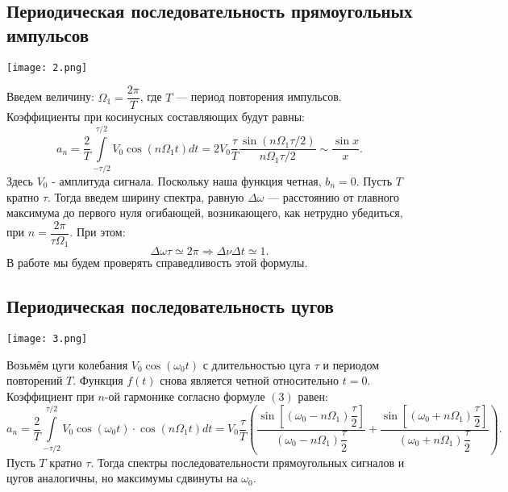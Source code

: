 \documentclass[a4paper,11pt]{extarticle}
\begin{document}
\subsection*{Периодическая последовательность прямоугольных импульсов}
\begin{center}
\texttt{[image: 2.png]}
\end{center}
Введем величину: $\Omega_1 = \dfrac{2\pi}{T}$,
где $T$ --- период повторения импульсов.
\n\n
Коэффициенты при косинусных составляющих будут равны:
\begin{equation}
a_n = \dfrac{2}{T}\int\limits_{-\tau/2}^{\tau/2}V_0\cos\left(n\Omega_1 t\right)dt = 2V_0\dfrac{\tau}{T}\dfrac{\sin\left(n\Omega_1\tau/2\right)}{n\Omega_1\tau/2} \sim \dfrac{\sin x}{x}.
\end{equation}
\n
Здесь $V_0$ - амплитуда сигнала.
\n
Поскольку наша функция четная, $b_n = 0$.
\n
Пусть $T$ кратно $\tau$. Тогда введем ширину спектра, равную $\Delta \omega$ --- расстоянию от главного максимума до первого нуля огибающей, возникающего, как нетрудно убедиться, при $n = \dfrac{2\pi}{\tau \Omega_1}$. При
этом:
\begin{equation}
\Delta \omega \tau \simeq 2\pi \Rightarrow \Delta \nu \Delta t \simeq 1.
\end{equation}
\n В работе мы будем проверять справедливость этой формулы.
\subsection*{Периодическая последовательность цугов}
\begin{center}
\texttt{[image: 3.png]}
\end{center}
Возьмём цуги колебания $V_0 \cos(\omega_0 t)$ с длительностью цуга $\tau$ и периодом повторений $T$.\n\n
Функция $f(t)$ снова является четной относительно $t = 0$. Коэффициент при $n$-ой гармонике согласно формуле $(3)$ равен:
\begin{equation}
a_n = \dfrac{2}{T}\int\limits_{-\tau/2}^{\tau/2}V_0 \cos \left(\omega_0t\right) \cdot \cos\left(n \Omega_1t\right)dt = V_0 \dfrac{\tau}{T}\left( \dfrac{\sin\left[\left(\omega_0 - n \Omega_1\right)\dfrac{\tau}{2}\right]}{\left( \omega_0 - n \Omega_1\right) \dfrac{\tau}{2}} + \dfrac{\sin\left[\left(\omega_0 + n \Omega_1\right)\dfrac{\tau}{2}\right]}{\left( \omega_0 + n \Omega_1\right) \dfrac{\tau}{2}}\right).
\end{equation}
Пусть $T$ кратно $\tau$. Тогда спектры последовательности прямоугольных сигналов и цугов аналогичны, но максимумы сдвинуты на $\omega_0$.
\end{document}
